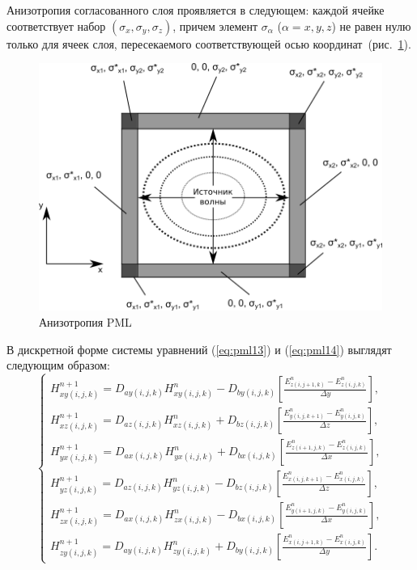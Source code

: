 Анизотропия согласованного слоя проявляется в следующем: каждой ячейке соответствует набор $(\sigma_x,\sigma_y,\sigma_z)$, причем элемент $\sigma_\alpha$ ($\alpha={x,y,z}$) не равен нулю только для ячеек слоя, пересекаемого соответствующей осью координат~(рис.~\ref{fig:PML}).

\afterpage{\clearpage}
\begin{figure}[p]
\centering
\includegraphics[width=1\textwidth]{include/graphics/image4195}
\caption{Анизотропия PML}
\label{fig:PML}
\end{figure}

В дискретной форме системы уравнений (\ref{eq:pml13}) и (\ref{eq:pml14}) выглядят следующим образом:
\begin{equation*}
\left\{
\begin{aligned}
H_{xy (i,j,k)}^{n+1} = D_{ay (i,j,k)} H_{xy (i,j,k)}^{n} - D_{by (i,j,k)}
\left[
    \frac{E_{z (i,j+1,k)}^n - E_{z (i,j,k)}^n}{\Delta y}
\right], \\
H_{xz (i,j,k)}^{n+1} = D_{az (i,j,k)} H_{xz (i,j,k)}^{n} + D_{bz (i,j,k)}
\left[
    \frac{E_{y (i,j,k+1)}^n - E_{y (i,j,k)}^n}{\Delta z}
\right], \\
H_{yx (i,j,k)}^{n+1} = D_{ax (i,j,k)} H_{yx (i,j,k)}^{n} + D_{bx (i,j,k)}
\left[
    \frac{E_{z (i+1,j,k)}^n - E_{z (i,j,k)}^n}{\Delta x}
\right], \\
H_{yz (i,j,k)}^{n+1} = D_{az (i,j,k)} H_{yz (i,j,k)}^{n} - D_{bz (i,j,k)}
\left[
    \frac{E_{x (i,j,k+1)}^n - E_{x (i,j,k)}^n}{\Delta z}
\right], \\
H_{zx (i,j,k)}^{n+1} = D_{ax (i,j,k)} H_{zx (i,j,k)}^{n} - D_{bx (i,j,k)}
\left[
    \frac{E_{y (i+1,j,k)}^n - E_{y (i,j,k)}^n}{\Delta x}
\right], \\
H_{zy (i,j,k)}^{n+1} = D_{ay (i,j,k)} H_{zy (i,j,k)}^{n} + D_{by (i,j,k)}
\left[
    \frac{E_{x (i,j+1,k)}^n - E_{x (i,j,k)}^n}{\Delta y}
\right].
\end{aligned}
\right.
\end{equation*}

